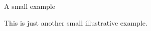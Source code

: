 \documentclass{article}
\begin{document}
\begin{huge}

\bfseries

A small example

\end{huge}

\bigskip

This is just another small illustrative example.
\end{document}
